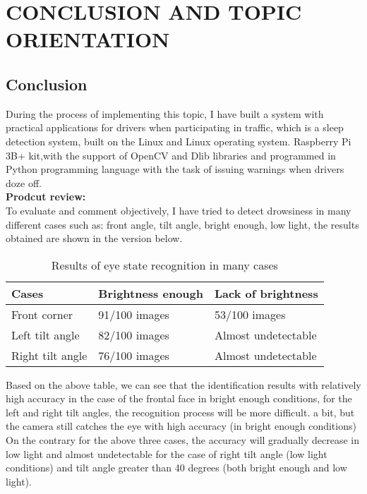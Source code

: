 \chapter{CONCLUSION AND TOPIC ORIENTATION}

\renewcommand{\headrulewidth}{0.5pt}
\renewcommand{\footrulewidth}{0.5pt}
\thispagestyle{plain}
\pagestyle{fancy}
\fancyhf{}
\raggedright
{}

\justifying

\section{Conclusion}
    During the process of implementing this topic, I have built a system with practical applications for drivers 
    when participating in traffic, which is a sleep detection system, built on the Linux and Linux operating system. 
    Raspberry Pi 3B+ kit,with the support of OpenCV and Dlib libraries and programmed in Python programming language 
    with the task of issuing warnings when drivers doze off. \\ 
    \vspace{3mm}
    \textbf{Prodcut review:} \\ 
    To evaluate and comment objectively, I have tried to detect drowsiness in many different cases such as: front angle, 
    tilt angle, bright enough, low light, the results obtained are shown in the version below. 
    \begin{table}[ht]
        \centering
        \begin{tabular}{| l | l | l |}
            \hline
            \rowcolor{lightgray} Cases & Brightness enough & Lack of brightness \\ \hline
            Front corner & 91/100 images & 53/100 images \\ \hline
            Left tilt angle & 82/100 images & Almost undetectable \\ \hline
            Right tilt angle & 76/100 images & Almost undetectable \\ \hline
        \end{tabular}
        \caption{Results of eye state recognition in many cases}
    \end{table}
    Based on the above table, we can see that the identification results with relatively high accuracy in the case of 
    the frontal face in bright enough conditions, for the left and right tilt angles, the recognition process will be 
    more difficult. a bit, but the camera still catches the eye with high accuracy (in bright enough conditions) \\ 
    \vspace{3mm}
    On the contrary for the above three cases, the accuracy will gradually decrease in low light and almost undetectable 
    for the case of right tilt angle (low light conditions) and tilt angle greater than 40 degrees (both bright enough and low light).


